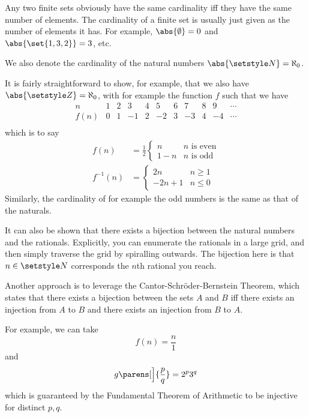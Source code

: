 Any two finite sets obviously have the same cardinality iff they have the same
number of elements. The cardinality of a finite set is usually just given as the
number of elements it has. For example, \(\abs{\emptyset} = 0\) and
\(\abs{\set{1, 3, 2}} = 3\), etc.

We also denote the cardinality of the natural numbers
\(\abs{\Naturals} = \aleph_0\).

It is fairly straightforward to show, for example, that we also have
\(\abs{\Integers} = \aleph_0\), with for example the function \(f\) such that we
have
\begin{equation*}
 \begin{array}{c|r|r|r|r|r|r|r|r|r|r}
  n & 1 & 2 & 3 & 4 & 5 & 6 & 7 & 8 & 9 & \cdots \\
  \hline
  f(n) & 0 & 1 & -1 & 2 & -2 & 3 & -3 & 4 & -4 & \cdots \\
 \end{array}
\end{equation*}
which is to say
\begin{align*}
 f(n) &=
  \frac 12 \begin{cases}
   n & \text{\(n\) is even} \\
   1 - n & \text{\(n\) is odd}
  \end{cases} \\
 f^{-1}(n) &=
  \begin{cases}
   2n & n \ge 1 \\
   -2n + 1 & n \le 0
  \end{cases}
\end{align*}
Similarly, the cardinality of for example the odd numbers is the same as that of
the naturals.

It can also be shown that there exists a bijection between the natural numbers
and the rationals. Explicitly, you can enumerate the rationals in a large grid,
and then simply traverse the grid by spiralling outwards. The bijection here is
that \(n \in \Naturals\) corresponds the \(n\)th rational you reach.

Another approach is to leverage the Cantor-Schr\"oder-Bernstein Theorem, which
states that there exists a bijection between the sets \(A\) and \(B\) iff there
exists an injection from \(A\) to \(B\) and there exists an injection from \(B\)
to \(A\).

For example, we can take
\begin{equation*}
 f(n) = \frac n1
\end{equation*}
and
\begin{equation*}
 g\parens[\Big]{\frac pq} = 2^p 3^q
\end{equation*}
which is guaranteed by the Fundamental Theorem of Arithmetic to be injective for
distinct \(p, q\).

